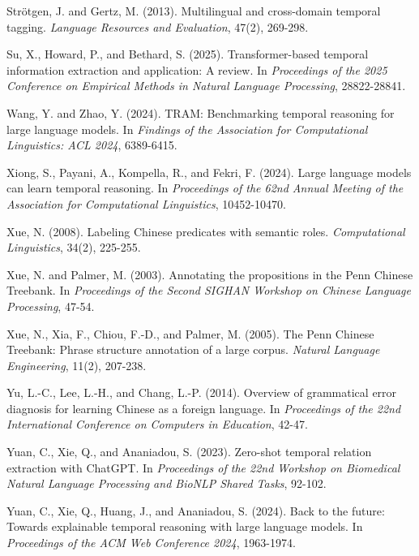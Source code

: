 \documentclass{CUP-JNL-NLP}
\begin{document}
Strötgen, J. and Gertz, M. (2013). Multilingual and cross-domain temporal tagging. \emph{Language Resources and Evaluation}, 47(2), 269-298.

Su, X., Howard, P., and Bethard, S. (2025). Transformer-based temporal information extraction and application: A review. In \emph{Proceedings of the 2025 Conference on Empirical Methods in Natural Language Processing}, 28822-28841.

Wang, Y. and Zhao, Y. (2024). TRAM: Benchmarking temporal reasoning for large language models. In \emph{Findings of the Association for Computational Linguistics: ACL 2024}, 6389-6415.

Xiong, S., Payani, A., Kompella, R., and Fekri, F. (2024). Large language models can learn temporal reasoning. In \emph{Proceedings of the 62nd Annual Meeting of the Association for Computational Linguistics}, 10452-10470.

Xue, N. (2008). Labeling Chinese predicates with semantic roles. \emph{Computational Linguistics}, 34(2), 225-255.

Xue, N. and Palmer, M. (2003). Annotating the propositions in the Penn Chinese Treebank. In \emph{Proceedings of the Second SIGHAN Workshop on Chinese Language Processing}, 47-54.

Xue, N., Xia, F., Chiou, F.-D., and Palmer, M. (2005). The Penn Chinese Treebank: Phrase structure annotation of a large corpus. \emph{Natural Language Engineering}, 11(2), 207-238.

Yu, L.-C., Lee, L.-H., and Chang, L.-P. (2014). Overview of grammatical error diagnosis for learning Chinese as a foreign language. In \emph{Proceedings of the 22nd International Conference on Computers in Education}, 42-47.

Yuan, C., Xie, Q., and Ananiadou, S. (2023). Zero-shot temporal relation extraction with ChatGPT. In \emph{Proceedings of the 22nd Workshop on Biomedical Natural Language Processing and BioNLP Shared Tasks}, 92-102.

Yuan, C., Xie, Q., Huang, J., and Ananiadou, S. (2024). Back to the future: Towards explainable temporal reasoning with large language models. In \emph{Proceedings of the ACM Web Conference 2024}, 1963-1974.

\label{lastpage}
\end{document}
